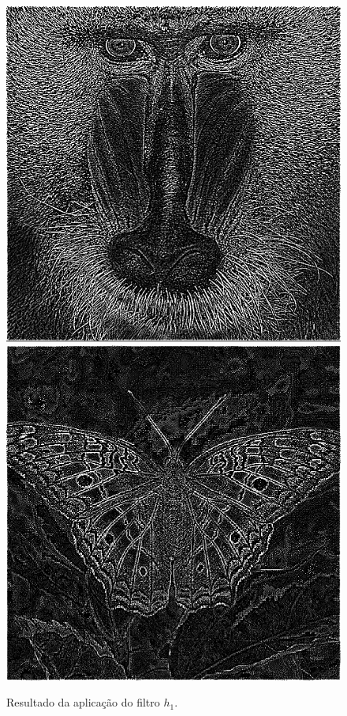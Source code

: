 \documentclass[twoside,twocolumn]{article}
\begin{document}
\begin{figure}[H]
\begin{center}
	\includegraphics[scale=.19]{figures/baboon_h1.png}
	\includegraphics[scale=.19]{figures/butterfly_h1.png}
\caption{Resultado da aplicação do filtro $h_{1}$.} \label{gdimotes}
\end{center}
\end{figure}
\end{document}
